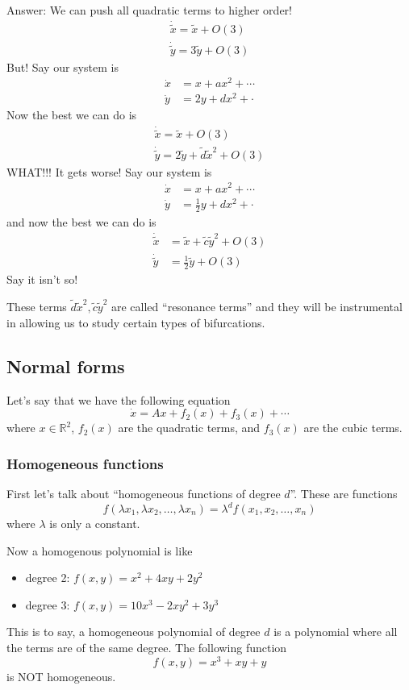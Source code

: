 \documentclass{article}
\begin{document}
Answer: We can push all quadratic terms to higher order!
\begin{align*}
    \dot{\tilde{x}} = \tilde{x} + O(3)\\
    \dot{\tilde{y}} = 3\tilde{y} + O(3)
\end{align*}
But! Say our system is 
\begin{align*}
    \dot{x}&=x + ax^2 + \cdots\\
    \dot{y}&=2y + dx^2 + \cdot
\end{align*}
Now the best we can do is 
\begin{align*}
    \dot{\tilde{x}} = \tilde{x} + O(3)\\
    \dot{\tilde{y}} = 2\tilde{y} + \tilde{d}\tilde{x}^2 + O(3)
\end{align*}
WHAT!!! It gets worse! Say our system is 
\begin{align*}
    \dot{x}&=x + ax^2 + \cdots\\
    \dot{y}&=\frac{1}{2}y + dx^2 + \cdot
\end{align*}
and now the best we can do is 
\begin{align*}
    \dot{\tilde{x}} &= \tilde{x} + \tilde{c}\tilde{y}^2 + O(3)\\
    \dot{\tilde{y}} &= \frac{1}{2}\tilde{y} + O(3)
\end{align*}
Say it isn't so!

These terms $\tilde{d}\tilde{x}^2,\tilde{c}\tilde{y}^2$ are called ``resonance terms'' and they will be instrumental in allowing us to study certain types of bifurcations.

\subsection{Normal forms}

Let's say that we have the following equation
\[
\dot{x}=Ax + f_2(x) + f_3(x) + \cdots
\]
where $x\in\mathbb{R}^2$, $f_2(x)$ are the quadratic terms, and $f_3(x)$ are the cubic terms.

\subsubsection{Homogeneous functions}

First let's talk about ``homogeneous functions of degree $d$''. These are functions 
\[
f\left(\lambda x_1, \lambda x_2, \ldots, \lambda x_n\right) = \lambda^d f\left( x_1, x_2, \ldots, x_n\right)
\]
where $\lambda$ is only a constant.

Now a homogenous polynomial is like
\begin{itemize}
    \item degree 2: $f(x,y)=x^2 + 4xy+ 2y^2$
    \item degree 3: $f(x,y) = 10x^3-2xy^2 + 3y^3$
\end{itemize}
This is to say, a homogeneous polynomial of degree $d$ is a polynomial where all the terms are of the same degree. The following function 
\[
f(x,y)=x^3 + xy + y
\]
is NOT homogeneous.
\end{document}
